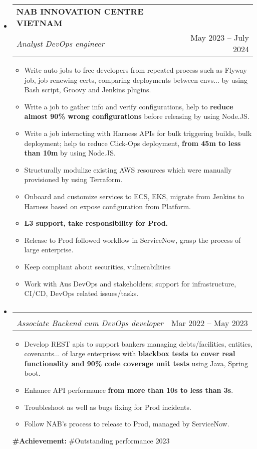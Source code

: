 \documentclass[letterpaper,12pt]{article}[leftmargin=*]
\makeatletter
\def \entryspacing {5pt}
\newcommand{\resumeEntryStart}{\begin{itemize}[leftmargin=2.5mm]}
\newcommand{\resumeEntryEnd}{\end{itemize}\vspace{\entryspacing}}
\newcommand{\resumeItemListStart}{\begin{itemize}[leftmargin=4.5mm]}
\newcommand{\resumeItemListEnd}{\end{itemize}}
\newcommand{\resumeItem}[1]{
  \item\small{
    {#1 \vspace{-2pt}}
  }
}
\newcommand{\resumeEntryTSDL}[4]{
  \vspace{-1pt}\item[]
    \begin{tabularx}{0.97\textwidth}{X@{\hspace{60pt}}r}
      \textbf{\color{primary}#1} & {\firabook\color{accent}\small#2} \\
      \textit{\color{accent}\small#3} & {\firabook\color{accent}\small#4} \\
    \end{tabularx}\vspace{-6pt}
}
\makeatother
\begin{document}
  \resumeEntryStart
    \resumeEntryTSDL
      {NAB INNOVATION CENTRE VIETNAM}{}
      {Analyst DevOps engineer}{May 2023 -- July 2024}
    \resumeItemListStart
      \resumeItem {Write auto jobs to free developers from repeated process such as Flyway job, job renewing certs, comparing deployments between envs... by using Bash script, Groovy and Jenkins plugins.}
      \resumeItem {Write a job to gather info and verify configurations, help to \textbf{reduce almost 90\% wrong configurations} before releasing by using Node.JS.}
      \resumeItem {Write a job interacting with Harness APIs for bulk triggering builds, bulk deployment; help to reduce Click-Ops deployment, \textbf{from 45m to less than 10m} by using Node.JS.}
      \resumeItem {Structurally modulize existing AWS resources which were manually provisioned by using Terraform.}
      \resumeItem {Onboard and customize services to ECS, EKS, migrate from Jenkins to Harness based on expose configuration from Platform.}
      \resumeItem {\textbf{L3 support, take responsibility for Prod.}}
      \vspace{1pt}\small{
      }\vspace{-1pt}
      \resumeItem {Release to Prod followed workflow in ServiceNow, grasp the process of large enterprise.}
      \resumeItem {Keep compliant about securities, vulnerabilities}
      \vspace{1pt}\small{
      }\vspace{-1pt}
      \resumeItem {Work with Aus DevOps and stakeholders; support for infrastructure, CI/CD, DevOps related issues/tasks.}
    \resumeItemListEnd

    \newpage
    \vspace{-15pt}\resumeEntryTSDL
      {}{}
      {Associate Backend cum DevOps developer}{Mar 2022 -- May 2023}
    \resumeItemListStart
      \resumeItem {Develop REST apis to support bankers managing debts/facilities, entities, covenants... of large enterprises with \textbf{blackbox tests to cover real functionality and 90\% code coverage unit tests} using Java, Spring boot.}
      \vspace{2pt}\small{
      }\vspace{-1pt}
      \resumeItem {Enhance API performance \textbf{from more than 10s to less than 3s}.}
      \resumeItem {Troubleshoot as well as bugs fixing for Prod incidents.}
      \resumeItem {Follow NAB's process to release to Prod, managed by ServiceNow.}
    \resumeItemListEnd
    \textbf{\color{primary}\small#Achievement: }{\small#Outstanding performance 2023}
  \resumeEntryEnd
\end{document}
